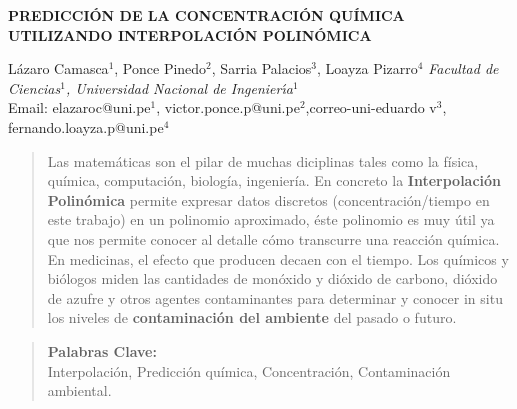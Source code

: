 \documentclass[10pt,a4paper]{article}
\begin{document}
\begin{center}
 {\Large \textbf{PREDICCIÓN DE LA CONCENTRACIÓN QUÍMICA UTILIZANDO INTERPOLACIÓN POLINÓMICA}}
\end{center}
\begin{center}
 Lázaro Camasca$^{1}$, Ponce Pinedo$^{2}$, Sarria Palacios$^{3}$, Loayza Pizarro$^{4}$\vskip5pt
 {\it Facultad de Ciencias$^1$, Universidad Nacional de Ingenier\'{\i}a$^1$\\}\vskip5pt
 Email: elazaroc@uni.pe$^{1}$, victor.ponce.p@uni.pe$^{2}$,correo-uni-eduardo v$^{3}$, fernando.loayza.p@uni.pe$^{4}$
\end{center}
\vspace*{0.4cm}
\begin{abstract}

\noindent Las matemáticas son el pilar de muchas diciplinas tales como la física, química, computación, biología, ingeniería.  En concreto la \textbf{Interpolación Polinómica} permite expresar datos discretos (concentración/tiempo en este trabajo) en un polinomio aproximado, éste polinomio es muy útil ya que nos permite conocer al detalle cómo transcurre una reacción química. En medicinas, el efecto que producen decaen con el tiempo. Los químicos y biólogos miden las cantidades de monóxido y dióxido de carbono, dióxido de azufre y otros agentes contaminantes para determinar y conocer in situ los niveles de \textbf{contaminación del ambiente} del pasado o futuro.

\end{abstract}

\begin{quotation}
	{\small
		\noindent\textbf{Palabras Clave:} \\ 
	Interpolación, Predicción química, Concentración, Contaminación ambiental.
	}
\end{quotation}
\end{document}
